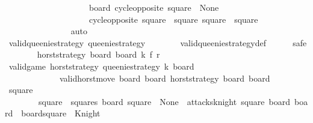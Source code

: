\begin{isabellebody}
\ \ \ \ \ \ \ \ \ \ \ \ \ \ \ \ \ \ \ \ {\isacartoucheopen}board{\isacharprime}\ {\isacharparenleft}cycle{\isacharunderscore}opposite\ square{\isacharprime}{\isacharparenright}\ {\isacharequal}\ None{\isacartoucheclose}\isanewline
\ \ \ \ \ \ \ \ \ \ \ \ \ \ \ \ \ \ \ \ {\isacartoucheopen}cycle{\isacharunderscore}opposite\ square{\isacharprime}\ {\isacharequal}\ square{\isacharprime}{\isacharprime}{\isacartoucheclose}\ {\isacartoucheopen}square{\isacharprime}\ {\isacharequal}\ square{\isacartoucheclose}\isanewline
\ \ \ \ \ \ \ \ \ \ \ \ \ \ \isamarkupfalse%
\ auto\isanewline
\ \ \ \ \ \ \ \ \ \ \isamarkupfalse%
\isanewline
\ \ \ \ \ \ \ \ \isamarkupfalse%
\isanewline
\ \ \ \ \ \ \isamarkupfalse%
\isanewline
\ \ \ \ \isamarkupfalse%
\isanewline
\isanewline
\ \ \ \ \isamarkupfalse%
\ {\isachardoublequoteopen}valid{\isacharunderscore}queenie{\isacharunderscore}strategy\ {\isacharquery}queenie{\isacharunderscore}strategy{\isachardoublequoteclose}\isanewline
\ \ \ \ \ \ \isamarkupfalse%
\ valid{\isacharunderscore}queenie{\isacharunderscore}strategy{\isacharunderscore}def\isanewline
\ \ \ \ \isamarkupfalse%
\ safe\isanewline
\ \ \ \ \ \ \isamarkupfalse%
\ horst{\isacharunderscore}strategy\ board\ board{\isacharprime}\ k\ f\ r\isanewline
\ \ \ \ \ \ \isamarkupfalse%
\ {\isachardoublequoteopen}valid{\isacharunderscore}game\ horst{\isacharunderscore}strategy\ {\isacharquery}queenie{\isacharunderscore}strategy\ k\ board{\isachardoublequoteclose}\isanewline
\ \ \ \ \ \ \ \ \ \ \ \ \ {\isachardoublequoteopen}valid{\isacharunderscore}horst{\isacharunderscore}move\ board\ board{\isacharprime}{\isachardoublequoteclose}\ {\isachardoublequoteopen}horst{\isacharunderscore}strategy\ board\ board{\isacharprime}{\isachardoublequoteclose}\isanewline
\ \ \ \ \ \ \isamarkupfalse%
\ \isamarkupfalse%
\ square\ \ \isanewline
\ \ \ \ \ \ \ {\isacharasterisk}{\isacharcolon}\ {\isachardoublequoteopen}square\ {\isasymin}\ squares{\isachardoublequoteclose}\ {\isachardoublequoteopen}board\ square\ {\isacharequal}\ None{\isachardoublequoteclose}\ {\isachardoublequoteopen}{\isasymnot}\ attacks{\isacharunderscore}knight\ square\ board{\isachardoublequoteclose}\ {\isachardoublequoteopen}board{\isacharprime}\ {\isacharequal}\ board{\isacharparenleft}square\ {\isasymmapsto}\ Knight{\isacharparenright}{\isachardoublequoteclose}\isanewline
\ \ \ \ \ \ \ \ \isamarkupfalse%

\end{isabellebody}
